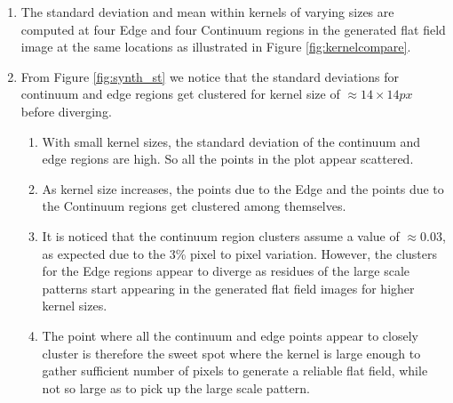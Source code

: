 \documentclass[11pt,a4paper]{article}
\begin{document}
\begin{enumerate}
		\item The standard deviation and mean within kernels of varying sizes are computed at four Edge and four Continuum regions in the generated flat field image at the same locations as illustrated in Figure \ref{fig:kernelcompare}.
		
		\item \label{point:stdev} From Figure \ref{fig:synth_st} we notice that the standard deviations for continuum and edge regions get clustered for kernel size of $\approx 14\times 14 px$ before diverging. 
		\begin{enumerate}
		\item With small kernel sizes, the standard deviation of the continuum and edge regions are high. So all the points in the plot appear scattered.
		
		\item As kernel size increases, the points due to the Edge and the points due to the Continuum regions get clustered among themselves.
		
		\item It is noticed that the continuum region clusters assume a value of $\approx 0.03$, as expected due to the 3\% pixel to pixel variation. However, the clusters for the Edge regions appear to diverge as residues of the large scale patterns start appearing in the generated flat field images for higher kernel sizes.
		
		\item The point where all the continuum and edge points appear to closely cluster is therefore the sweet spot where the kernel is large enough to gather sufficient number of pixels to generate a reliable flat field, while not so large as to pick up the large scale pattern.
		\end{enumerate}
		

\end{enumerate}
\end{document}
